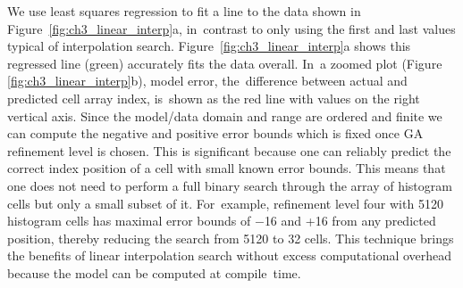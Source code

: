 We use least squares regression to fit a line to the data shown in Figure~\ref{fig:ch3_linear_interp}a, in~contrast to only using the first and last values typical of interpolation search. Figure~\ref{fig:ch3_linear_interp}a shows this regressed line (green) accurately fits the data overall. In~a zoomed plot (Figure \ref{fig:ch3_linear_interp}b), model error, the~difference between actual and predicted cell array index, is~shown as the red line with values on the right vertical axis. Since the model/data domain and range are ordered and finite we can compute the negative and positive error bounds which is fixed once GA refinement level is chosen. This is significant because one can reliably predict the correct index position of a cell with small known error bounds. This means that one does not need to perform a full binary search through the array of histogram cells but only a small subset of it. For~example, refinement level four with 5120 histogram cells has maximal error bounds of $-$16 and +16 from any predicted position, thereby reducing the search from 5120 to 32 cells. This technique brings the benefits of linear interpolation search without excess computational overhead because the model can be computed at compile~time.
\vspace{-6pt}
